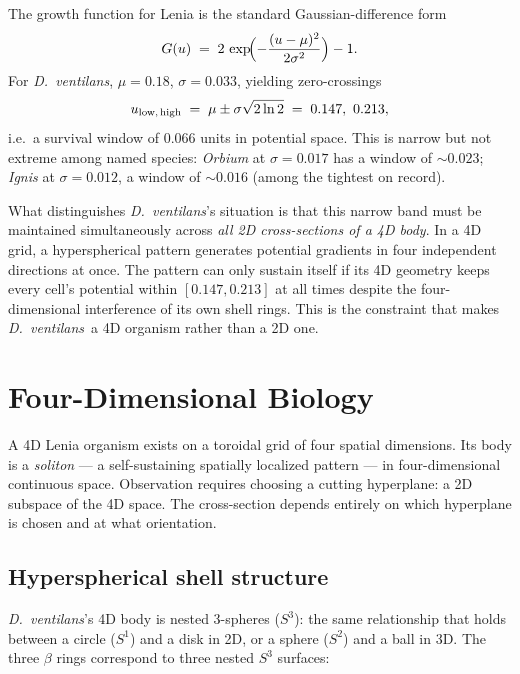 \documentclass[11pt,a4paper]{article}
\newcommand{\spc}[1]{\textit{#1}}  %
\newcommand{\DV}{\spc{D.\ ventilans}}
\begin{document}
The growth function for Lenia is the standard Gaussian-difference form
\begin{equation}
G(u) \;=\; 2\,\exp\!\Bigl(-\frac{(u-\mu)^{2}}{2\sigma^{2}}\Bigr) - 1.
\end{equation}
For \DV, $\mu=0.18$, $\sigma=0.033$, yielding zero-crossings
\begin{equation}
u_{\text{low,\,high}} \;=\; \mu \pm \sigma\sqrt{2\ln 2}
\;=\; 0.147,\ 0.213,
\end{equation}
i.e.\ a survival window of $0.066$ units in potential space. This is
narrow but not extreme among named species: \spc{Orbium} at $\sigma=0.017$
has a window of $\sim 0.023$; \spc{Ignis} at $\sigma=0.012$, a window of
$\sim 0.016$ (among the tightest on record).

What distinguishes \DV's situation is that this narrow band must be
maintained simultaneously across \emph{all 2D cross-sections of a 4D body}.
In a 4D grid, a hyperspherical pattern generates potential gradients in
four independent directions at once. The pattern can only sustain itself
if its 4D geometry keeps every cell's potential within $[0.147, 0.213]$
at all times despite the four-dimensional interference of its own shell
rings. This is the constraint that makes \DV\ a 4D organism rather than
a 2D one.

\section{Four-Dimensional Biology}

A 4D Lenia organism exists on a toroidal grid of four spatial dimensions.
Its body is a \emph{soliton} --- a self-sustaining spatially localized
pattern --- in four-dimensional continuous space. Observation requires
choosing a cutting hyperplane: a 2D subspace of the 4D space. The
cross-section depends entirely on which hyperplane is chosen and at what
orientation.

\subsection{Hyperspherical shell structure}

\DV's 4D body is nested 3-spheres ($S^{3}$): the same relationship that
holds between a circle ($S^{1}$) and a disk in 2D, or a sphere ($S^{2}$)
and a ball in 3D. The three $\beta$ rings correspond to three nested
$S^{3}$ surfaces:
\end{document}
